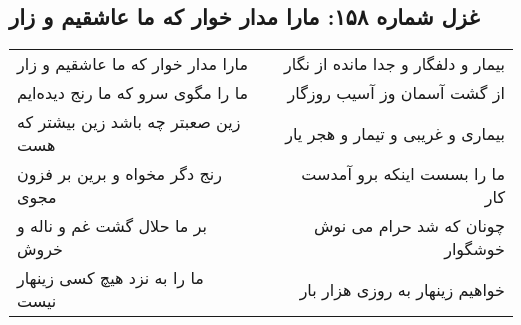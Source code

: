 \begin{center}
\section*{غزل شماره ۱۵۸: مارا مدار خوار که ما عاشقیم و زار}
\label{sec:158}
\begin{longtable}{l p{0.5cm} r}
مارا مدار خوار که ما عاشقیم و زار
&&
بیمار و دلفگار و جدا مانده از نگار
\\
ما را مگوی سرو که ما رنج دیده‌ایم
&&
از گشت آسمان وز آسیب روزگار
\\
زین صعبتر چه باشد زین بیشتر که هست
&&
بیماری و غریبی و تیمار و هجر یار
\\
رنج دگر مخواه و برین بر فزون مجوی
&&
ما را بسست اینکه برو آمدست کار
\\
بر ما حلال گشت غم و ناله و خروش
&&
چونان که شد حرام می نوش خوشگوار
\\
ما را به نزد هیچ کسی زینهار نیست
&&
خواهیم زینهار به روزی هزار بار
\\
\end{longtable}
\end{center}
